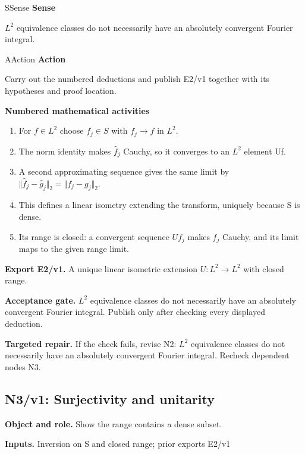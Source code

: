 \documentclass[preprint,12pt,aps,pra,showkeys,amsmath,amssymb,superscriptaddress,floatfix]{revtex4-2}
\theoremstyle{definition}
\theoremstyle{remark}
\newcommand{\mmfaculty}[3]{%
 \begin{mmfacultybox}{#1}{#2}
 {\sffamily\bfseries\color{MMBlue}#2}\par\smallskip #3
 \end{mmfacultybox}}
\newcommand{\field}[2]{\par\smallskip\noindent\textbf{#1.} #2\par}
\begin{document}
\mmfaculty{S}{Sense}{\(L^{2}\) equivalence classes do not necessarily have an absolutely
convergent Fourier integral.}

\mmfaculty{A}{Action}{Carry out the numbered deductions and publish E2/v1 together with its
hypotheses and proof location.}

\smallskip\noindent\textbf{Numbered mathematical activities}

\begin{enumerate}[label=N2.\arabic*,leftmargin=3.4em]

\item For \(f\in L^{2}\) choose \(f_j\in S\) with \(f_j\to f\) in \(L^{2}\).

\item The norm identity makes \(\widehat f_j\) Cauchy, so it converges to an
\(L^{2}\) element Uf.

\item A second approximating sequence gives the same limit by
\(\Vert \widehat f_j-\widehat g_j\Vert _{2}=\Vert f_j-g_j\Vert _{2}\).

\item This defines a linear isometry extending the transform, uniquely because
S is dense.

\item Its range is closed: a convergent sequence \(Uf_j\) makes \(f_j\)
Cauchy, and its limit maps to the given range limit.

\end{enumerate}

\field{Export E2/v1}{A unique linear isometric extension \(U:L^{2}\to L^{2}\) with closed
range.}

\field{Acceptance gate}{\(L^{2}\) equivalence classes do not necessarily have an absolutely
convergent Fourier integral. Publish only after checking every displayed
deduction.}

\field{Targeted repair}{If the check fails, revise N2: \(L^{2}\) equivalence classes do not
necessarily have an absolutely convergent Fourier integral. Recheck
dependent nodes N3.}

\clearpage

\subsection{N3/v1: Surjectivity and unitarity}

\field{Object and role}{Show the range contains a dense subset.}

\field{Inputs}{Inversion on S and closed range; prior exports E2/v1}
\end{document}
